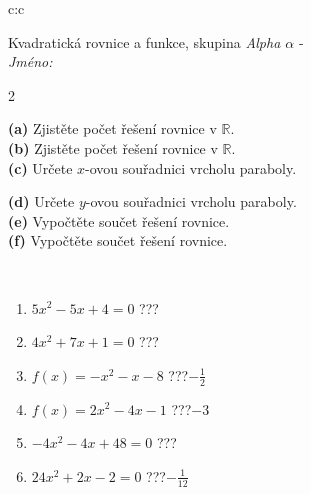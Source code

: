 \documentclass[10pt]{report}
\begin{document}
\thispagestyle{empty}
\begin{tabular}{c:c}
\begin{minipage}[c][104.5mm][t]{0.5\linewidth}
\begin{center}
\vspace{7mm}
{\huge \LARGE Kvadratická rovnice a funkce, skupina \textit{Alpha $\alpha$} -}\\[5mm]
\textit{Jméno:}\phantom{xxxxxxxxxxxxxxxxxxxxxxxxxxxxxxxxxxxxxxxxxxxxxxxxxxxxxxxxxxxxxxxxx}\\[5mm]
\begin{minipage}{0.95\linewidth}
\begin{center}
{\small \begin{multicols}{2} \raggedright
\textbf{(a)} Zjistěte počet řešení rovnice v \(\mathbb{R}\). \\[1mm]
\textbf{(b)} Zjistěte počet řešení rovnice v \(\mathbb{R}\). \\[1mm]
\textbf{(c)} Určete \(x\)-ovou souřadnici vrcholu paraboly. \par \columnbreak
\textbf{(d)} Určete \(y\)-ovou souřadnici vrcholu paraboly. \\[1mm]
\textbf{(e)} Vypočtěte součet řešení rovnice. \\[1mm]
\textbf{(f)} Vypočtěte součet řešení rovnice.
\end{multicols}
}
\end{center}
\end{minipage}
\\[4mm]
\begin{minipage}{0.79\linewidth}
\begin{center}
\begin{varwidth}{\linewidth}
\begin{enumerate}
\Large
\item $5x^2-5x+4=0$\quad \dotfill\; ???\;\dotfill {}
\item $4x^2+7x+1=0$\quad \dotfill\; ???\;\dotfill {}
\item $f(x)=-x^2-x-8$\quad \dotfill\; ???\;\dotfill \quad $-\frac{1}{2}$
\item $f(x)=2x^2-4x-1$\quad \dotfill\; ???\;\dotfill \quad $-3$
\item $-4x^2-4x+48=0$\quad \dotfill\; ???\;\dotfill {}
\item $24x^2+2x-2=0$\quad \dotfill\; ???\;\dotfill \quad $-\frac{1}{12}$
\end{enumerate}
\end{varwidth}
\end{center}

\end{minipage}
\end{center}
\end{minipage}
\end{tabular}
\end{document}
